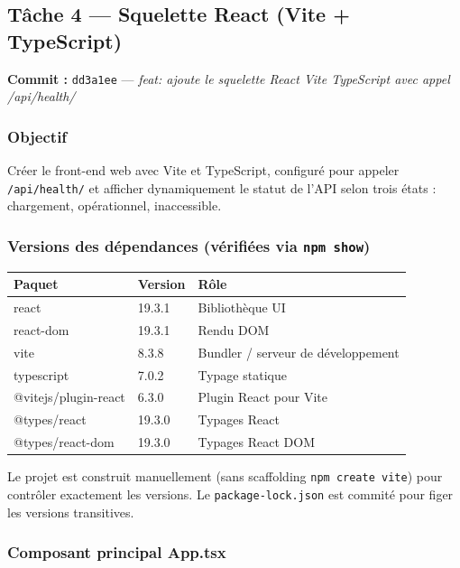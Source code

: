\documentclass[11pt,a4paper]{article}
\begin{document}
\subsection{Tâche 4 --- Squelette React (Vite + TypeScript)}

\textbf{Commit :} \texttt{dd3a1ee} --- \textit{feat: ajoute le squelette React Vite TypeScript
avec appel /api/health/}

\subsubsection*{Objectif}

Créer le front-end web avec Vite et TypeScript, configuré pour appeler \texttt{/api/health/}
et afficher dynamiquement le statut de l'API selon trois états : chargement, opérationnel,
inaccessible.

\subsubsection*{Versions des dépendances (vérifiées via \texttt{npm show})}

\begin{center}
\renewcommand{\arraystretch}{1.3}
\begin{tabular}{lll}
  \toprule
  \textbf{Paquet} & \textbf{Version} & \textbf{Rôle} \\
  \midrule
  react                & 19.3.1 & Bibliothèque UI \\
  react-dom            & 19.3.1 & Rendu DOM \\
  vite                 & 8.3.8  & Bundler / serveur de développement \\
  typescript           & 7.0.2  & Typage statique \\
  @vitejs/plugin-react & 6.3.0  & Plugin React pour Vite \\
  @types/react         & 19.3.0 & Typages React \\
  @types/react-dom     & 19.3.0 & Typages React DOM \\
  \bottomrule
\end{tabular}
\end{center}

Le projet est construit manuellement (sans scaffolding \texttt{npm create vite}) pour
contrôler exactement les versions. Le \texttt{package-lock.json} est commité pour figer
les versions transitives.

\subsubsection*{Composant principal App.tsx}
\end{document}
